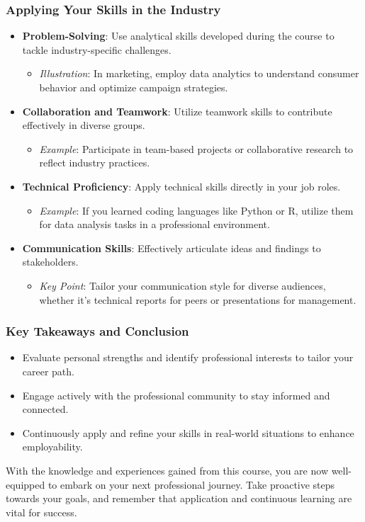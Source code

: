 \documentclass[aspectratio=169]{beamer}
\begin{document}
\begin{frame}[fragile]
    \frametitle{Applying Your Skills in the Industry}
    \begin{itemize}
        \item \textbf{Problem-Solving}: Use analytical skills developed during the course to tackle industry-specific challenges.
        \begin{itemize}
            \item \textit{Illustration}: In marketing, employ data analytics to understand consumer behavior and optimize campaign strategies.
        \end{itemize}
        
        \item \textbf{Collaboration and Teamwork}: Utilize teamwork skills to contribute effectively in diverse groups.
        \begin{itemize}
            \item \textit{Example}: Participate in team-based projects or collaborative research to reflect industry practices.
        \end{itemize}
        
        \item \textbf{Technical Proficiency}: Apply technical skills directly in your job roles.
        \begin{itemize}
            \item \textit{Example}: If you learned coding languages like Python or R, utilize them for data analysis tasks in a professional environment.
        \end{itemize}
        
        \item \textbf{Communication Skills}: Effectively articulate ideas and findings to stakeholders.
        \begin{itemize}
            \item \textit{Key Point}: Tailor your communication style for diverse audiences, whether it's technical reports for peers or presentations for management.
        \end{itemize}
    \end{itemize}
\end{frame}

\begin{frame}[fragile]
    \frametitle{Key Takeaways and Conclusion}
    \begin{itemize}
        \item Evaluate personal strengths and identify professional interests to tailor your career path.
        \item Engage actively with the professional community to stay informed and connected.
        \item Continuously apply and refine your skills in real-world situations to enhance employability.
    \end{itemize}
    
    With the knowledge and experiences gained from this course, you are now well-equipped to embark on your next professional journey. Take proactive steps towards your goals, and remember that application and continuous learning are vital for success.
\end{frame}
\end{document}
